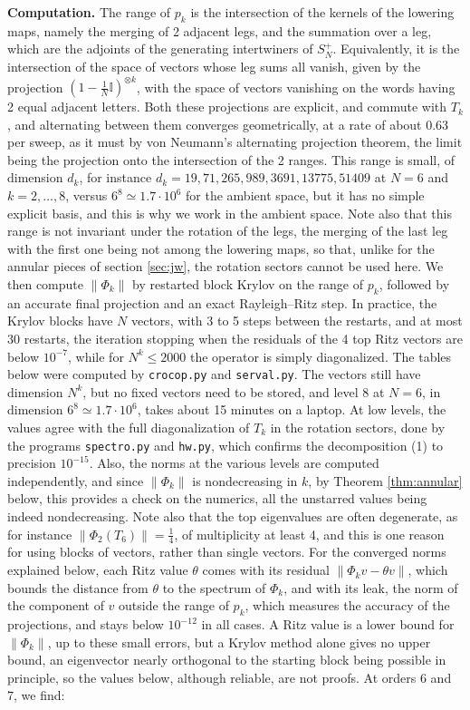 \documentclass[11pt]{amsart}
\begin{document}
\medskip

\noindent\textbf{Computation.} The range of $p_k$ is the intersection of the kernels of the lowering maps, namely the merging of 2 adjacent legs, and the summation over a leg, which are the adjoints of the generating intertwiners of $S_N^+$. Equivalently, it is the intersection of the space of vectors whose leg sums all vanish, given by the projection $(1-\frac{1}{N}\mathbb I)^{\otimes k}$, with the space of vectors vanishing on the words having 2 equal adjacent letters. Both these projections are explicit, and commute with $T_k$, and alternating between them converges geometrically, at a rate of about $0.63$ per sweep, as it must by von Neumann's alternating projection theorem, the limit being the projection onto the intersection of the 2 ranges. This range is small, of dimension $d_k$, for instance $d_k=19,71,265,989,3691,13775,51409$ at $N=6$ and $k=2,\ldots,8$, versus $6^8\simeq1.7\cdot10^6$ for the ambient space, but it has no simple explicit basis, and this is why we work in the ambient space. Note also that this range is not invariant under the rotation of the legs, the merging of the last leg with the first one being not among the lowering maps, so that, unlike for the annular pieces of section \ref{sec:jw}, the rotation sectors cannot be used here. We then compute $\|\Phi_k\|$ by restarted block Krylov on the range of $p_k$, followed by an accurate final projection and an exact Rayleigh--Ritz step. In practice, the Krylov blocks have $N$ vectors, with 3 to 5 steps between the restarts, and at most 30 restarts, the iteration stopping when the residuals of the 4 top Ritz vectors are below $10^{-7}$, while for $N^k\leq2000$ the operator is simply diagonalized. The tables below were computed by \texttt{crocop.py} and \texttt{serval.py}. The vectors still have dimension $N^k$, but no fixed vectors need to be stored, and level 8 at $N=6$, in dimension $6^8\simeq1.7\cdot10^6$, takes about 15 minutes on a laptop. At low levels, the values agree with the full diagonalization of $T_k$ in the rotation sectors, done by the programs \texttt{spectro.py} and \texttt{hw.py}, which confirms the decomposition (1) to precision $10^{-15}$. Also, the norms at the various levels are computed independently, and since $\|\Phi_k\|$ is nondecreasing in $k$, by Theorem \ref{thm:annular} below, this provides a check on the numerics, all the unstarred values being indeed nondecreasing. Note also that the top eigenvalues are often degenerate, as for instance $\|\Phi_2(T_6)\|=\frac{1}{4}$, of multiplicity at least 4, and this is one reason for using blocks of vectors, rather than single vectors. For the converged norms explained below, each Ritz value $\theta$ comes with its residual $\|\Phi_kv-\theta v\|$, which bounds the distance from $\theta$ to the spectrum of $\Phi_k$, and with its leak, the norm of the component of $v$ outside the range of $p_k$, which measures the accuracy of the projections, and stays below $10^{-12}$ in all cases. A Ritz value is a lower bound for $\|\Phi_k\|$, up to these small errors, but a Krylov method alone gives no upper bound, an eigenvector nearly orthogonal to the starting block being possible in principle, so the values below, although reliable, are not proofs. At orders 6 and 7, we find:
\end{document}
